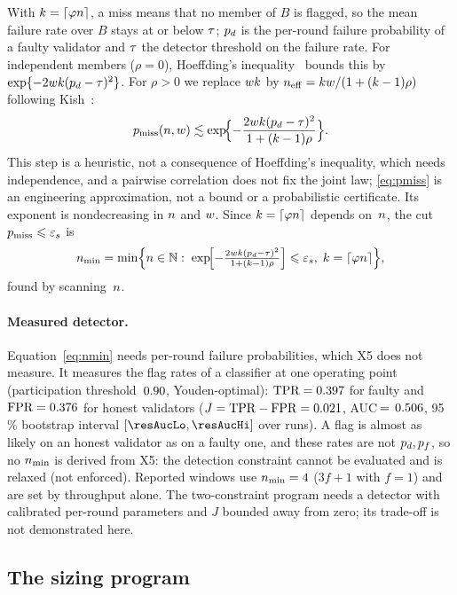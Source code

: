 With $k=\lceil\varphi n\rceil$, a miss means that no member of $B$ is flagged, so
the mean failure rate over $B$ stays at or below $\tau$; $p_{d}$ is the per-round
failure probability of a faulty validator and $\tau$ the detector threshold on
the failure rate. For independent members ($\rho=0$), Hoeffding's
inequality~\cite{hoeffding1963} bounds this by $\exp\{-2wk(p_{d}-\tau)^{2}\}$.
For $\rho>0$ we replace $wk$ by $n_{\mathrm{eff}}=kw/(1+(k-1)\rho)$ following
Kish~\cite{kish1965}:\label{st:rho}
\begin{equation}
\pmiss(\n,\w)\lesssim\exp\!\Bigl\{-\frac{2\w\kf(\pd-\thr)^{2}}{1+(\kf-1)\rho}\Bigr\}.
\label{eq:pmiss}
\end{equation}
This step is a heuristic, not a consequence of Hoeffding's inequality, which
needs independence, and a pairwise correlation does not fix the joint law;
\eqref{eq:pmiss} is an engineering approximation, not a bound or a probabilistic
certificate. Its exponent is nondecreasing in $n$ and $w$. Since
$k=\lceil\varphi n\rceil$ depends on~$n$, the cut $p_{\mathrm{miss}}\leqslant\varepsilon_{s}$ is
\begin{equation}
\nmin=\min\Bigl\{\n\in\mathbb{N}:\;
\exp\!\Bigl[-\tfrac{2\w\kf(\pd-\thr)^{2}}{1+(\kf-1)\rho}\Bigr]\le\epss,\;
\kf=\lceil\phi\n\rceil\Bigr\},
\label{eq:nmin}
\end{equation}
found by scanning~$n$.

\paragraph{Measured detector.}
Equation~\eqref{eq:nmin} needs per-round failure probabilities, which X5 does
not measure. It measures the flag rates of a classifier at one operating point
(participation threshold~$0.90$, Youden-optimal):
$\mathrm{TPR}=0.397$ for faulty and $\mathrm{FPR}=0.376$ for honest validators
($J=\mathrm{TPR}-\mathrm{FPR}=0.021$, AUC$\,=\,0.506$, 95\,\% bootstrap interval
$[\resAucLo,\resAucHi]$ over runs). A flag is almost as likely on an
honest validator as on a faulty one, and these rates are not $p_{d},p_{f}$, so no
$\nmin$ is derived from X5: the detection constraint cannot be evaluated and is
relaxed (not enforced). Reported windows use $\nmin=\resNminCase$ ($3f+1$ with
$f=1$) and are set by throughput alone. The two-constraint program needs a
detector with calibrated per-round parameters and $J$ bounded away from zero;
its trade-off is not demonstrated here.

\subsection{The sizing program}


